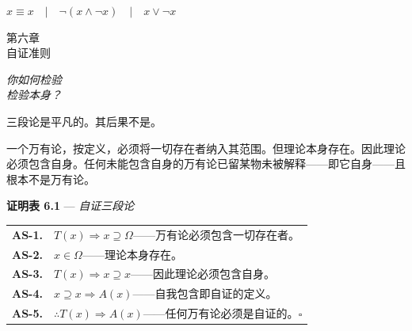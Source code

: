 \documentclass[10pt, openany, oneside]{book}
\renewcommand{\footnotesize}{\fontsize{8.5}{11}\selectfont}
\renewcommand{\large}{\fontsize{11.5}{14}\selectfont}
\renewcommand{\huge}{\fontsize{17}{21}\selectfont}
\begin{document}
\vspace{0.5em}

\begin{center}
    $x \equiv x \quad | \quad \neg(x \wedge \neg x) \quad | \quad x \vee \neg x$
\end{center}


%
%
%

\newpage

\begin{center}
    {\huge\scshape 第六章}\\[0.3em]
    {\large\scshape 自证准则}
\end{center}

\vspace{1.5em}

\begin{center}
    \itshape
    你如何检验\\
    检验本身？
\end{center}

\vspace{2em}


\noindent 三段论是平凡的。其后果不是。

一个万有论，按定义，必须将一切存在者纳入其范围。但理论本身存在。因此理论必须包含自身。任何未能包含自身的万有论已留某物未被解释——即它自身——且根本不是万有论。

\vspace{0.5em}

\textbf{证明表 6.1} --- \textit{自证三段论}

\vspace{0.5em}

{\footnotesize
\noindent\begin{tabular}{r p{}}
\textbf{AS-1.} & $T(x) \Rightarrow x \supseteq \Omega$——万有论必须包含一切存在者。\\[0.3em]
\textbf{AS-2.} & $x \in \Omega$——理论本身存在。\\[0.3em]
\textbf{AS-3.} & $T(x) \Rightarrow x \supseteq x$——因此理论必须包含自身。\\[0.3em]
\textbf{AS-4.} & $x \supseteq x \Rightarrow A(x)$——自我包含即自证的定义。\\[0.3em]
\textbf{AS-5.} & $\therefore T(x) \Rightarrow A(x)$——任何万有论必须是自证的。$\square$ \\[0.3em]
\end{tabular}
}
\end{document}
